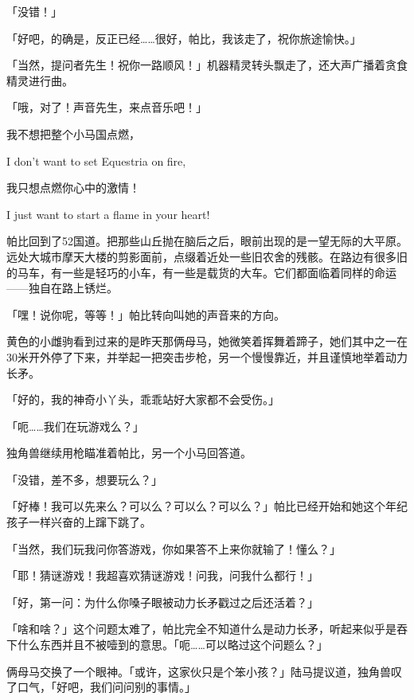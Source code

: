 「没错！」

「好吧，的确是，反正已经……很好，帕比，我该走了，祝你旅途愉快。」

「当然，提问者先生！祝你一路顺风！」机器精灵转头飘走了，还大声广播着贪食精灵进行曲。

「哦，对了！声音先生，来点音乐吧！」

\begin{song}
我不想把整个小马国点燃，

I don't want to set Equestria on fire,

\medskip

我只想点燃你心中的激情！

I just want to start a flame in your heart!
\end{song}

\horizonline


帕比回到了52国道。把那些山丘抛在脑后之后，眼前出现的是一望无际的大平原。远处大城市摩天大楼的剪影面前，点缀着近处一些旧农舍的残骸。在路边有很多旧的马车，有一些是轻巧的小车，有一些是载货的大车。它们都面临着同样的命运——独自在路上锈烂。

「嘿！说你呢，等等！」帕比转向叫她的声音来的方向。

黄色的小雌驹看到过来的是昨天那俩母马，她微笑着挥舞着蹄子，她们其中之一在30米开外停了下来，并举起一把突击步枪，另一个慢慢靠近，并且谨慎地举着动力长矛。

「好的，我的神奇小丫头，乖乖站好大家都不会受伤。」

「呃……我们在玩游戏么？」

独角兽继续用枪瞄准着帕比，另一个小马回答道。

「没错，差不多，想要玩么？」

「好棒！我可以先来么？可以么？可以么？可以么？」帕比已经开始和她这个年纪孩子一样兴奋的上蹿下跳了。

「当然，我们玩我问你答游戏，你如果答不上来你就输了！懂么？」

「耶！猜谜游戏！我超喜欢猜谜游戏！问我，问我什么都行！」

「好，第一问：为什么你嗓子眼被动力长矛戳过之后还活着？」

「啥和啥？」这个问题太难了，帕比完全不知道什么是动力长矛，听起来似乎是吞下什么东西并且不被噎到的意思。「呃……可以略过这个问题么？」

俩母马交换了一个眼神。「或许，这家伙只是个笨小孩？」陆马提议道，独角兽叹了口气，「好吧，我们问问别的事情。」

